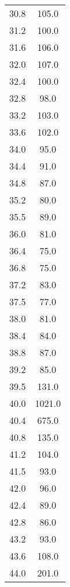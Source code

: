 \begin{table}[htp]
\begin{center}
\begin{tabular}{cc}
                        30.8 & 105.0\\
                        31.2 & 100.0\\
                        31.6 & 106.0\\
                        32.0 & 107.0\\
                        32.4 & 100.0\\
                        32.8 & 98.0\\
                        33.2 & 103.0\\
                        33.6 & 102.0\\
                        34.0 & 95.0\\
                        34.4 & 91.0\\
                        34.8 & 87.0\\
                        35.2 & 80.0\\
                        35.5 & 89.0\\
                        36.0 & 81.0\\
                        36.4 & 75.0\\
                        36.8 & 75.0\\
                        37.2 & 83.0\\
                        37.5 & 77.0\\
                        38.0 & 81.0\\
                        38.4 & 84.0\\
                        38.8 & 87.0\\
                        39.2 & 85.0\\
                        39.5 & 131.0\\
                        40.0 & 1021.0\\
                        40.4 & 675.0\\
                        40.8 & 135.0\\
                        41.2 & 104.0\\
                        41.5 & 93.0\\
                        42.0 & 96.0\\
                        42.4 & 89.0\\
                        42.8 & 86.0\\
                        43.2 & 93.0\\
                        43.6 & 108.0\\
                        44.0 & 201.0\\

\end{tabular}
\end{center}
\end{table}
